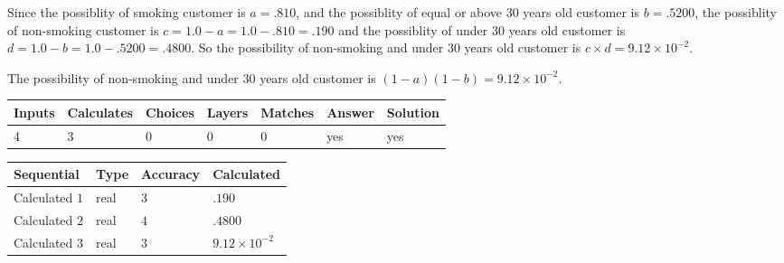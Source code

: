 \documentclass[12pt]{article}
\begin{document}
 

Since the possiblity of  %
smoking customer is $ a =  %
.810 $,
and the possiblity of  %
equal or above 30 years old customer is $ b =  %
.5200 $,
the possiblity of  %
non-smoking customer is $ c = 1.0 - a = 1.0 -
.810
=  %
.190 $ and the possiblity of  %
under 30 years old
customer is $ d = 1.0 - b = 1.0 -  %
.5200 =  %
.4800  $.
So the possibility of  %
 non-smoking and  %
under 30 years old
customer is $ c \times d =  %
9.12 \times 10^{-2} $.
 
 
 
\noindent{}
 
 

 
 
 
\noindent{}
 
 

The possibility of  %
 non-smoking and  %
under 30 years old
customer is $ (1-a)(1-b) =  %
9.12 \times 10^{-2} $.
 
 
\noindent{}
 
 

 
\vspace{0.3in}
   
   
   
   
\noindent\begin{tabular}{|l|l|l|l|l|l|l|}
 \hline
Inputs & Calculates & Choices & Layers & Matches & Answer & Solution \\ \hline
           4 & 
           3 & 
           0
  & 
           0 & 
           0 & 
  yes & 
  yes 
  \\ \hline
 \end{tabular}
   
   
   
   
\noindent{}
   
   
  
  
\noindent\begin{tabular}{|l|l|l|l|}
\hline
 Sequential & Type & Accuracy & Calculated \\ 
\hline
 
 
  Calculated $           1$ & real & $           3 $ & 
 $ .190 $ 
 \\  \hline  
 
 
  Calculated $           2$ & real & $           4 $ & 
 $ .4800 $ 
 \\  \hline  
 
 
  Calculated $           3$ & real & $           3 $ & 
 $ 9.12 \times 10^{-2} $ 
 \\  \hline  
 \end{tabular}
   
\end{document}
